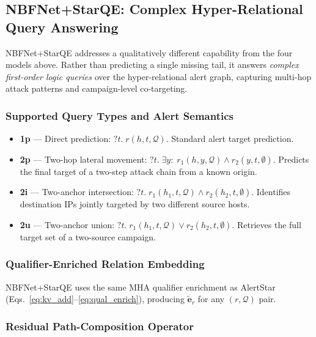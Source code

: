 \documentclass[10pt,journal,compsoc]{IEEEtran}
\begin{document}
\subsection{NBFNet+StarQE: Complex Hyper-Relational
            Query Answering}
\label{ssec:nbfstarqe}

NBFNet+StarQE addresses a qualitatively different
capability from the four models above.
Rather than predicting a single missing tail, it answers
\emph{complex first-order logic queries} over the
hyper-relational alert graph, capturing multi-hop attack
patterns and campaign-level co-targeting.

\subsubsection{Supported Query Types and Alert Semantics}
\label{sssec:nbfqe_types}

\begin{itemize}
  \item \textbf{1p} — Direct prediction:
    $?t.\; r(h, t, \mathcal{Q})$.
    Standard alert target prediction.
  \item \textbf{2p} — Two-hop lateral movement:
    $?t.\; \exists y:\;
    r_1(h, y, \mathcal{Q}) \wedge r_2(y, t, \emptyset)$.
    Predicts the final target of a two-step attack chain
    from a known origin.
  \item \textbf{2i} — Two-anchor intersection:
    $?t.\; r_1(h_1, t, \mathcal{Q})
    \wedge r_2(h_2, t, \emptyset)$.
    Identifies destination IPs jointly targeted by two
    different source hosts.
  \item \textbf{2u} — Two-anchor union:
    $?t.\; r_1(h_1, t, \mathcal{Q})
    \vee r_2(h_2, t, \emptyset)$.
    Retrieves the full target set of a two-source campaign.
\end{itemize}

\subsubsection{Qualifier-Enriched Relation Embedding}
\label{sssec:nbfqe_qual}

NBFNet+StarQE uses the same MHA qualifier enrichment as
AlertStar (Eqs.~\ref{eq:kv_add}--\ref{eq:qual_enrich}),
producing $\tilde{\mathbf{e}}_r$ for any
$(r, \mathcal{Q})$ pair.

\subsubsection{Residual Path-Composition Operator}
\label{sssec:nbfqe_compose}
\end{document}
